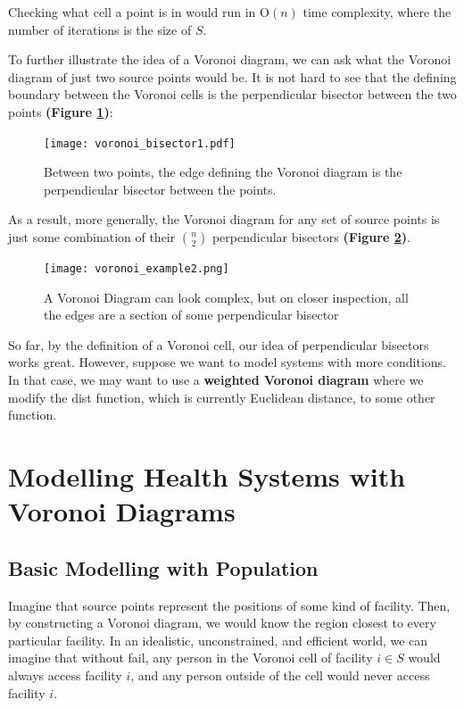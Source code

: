 \documentclass{article}
\begin{document}
Checking what cell a point is in would run in $\mathrm{O}(n)$ time complexity, where the number of iterations is the size of $S$.

To further illustrate the idea of a Voronoi diagram, we can ask what the Voronoi diagram of just two source points would be. It is not hard to see that the defining boundary between the Voronoi cells is the perpendicular bisector between the two points \textbf{(Figure \ref{fig:voronoi-diagram-of-2})}:

\begin{figure}[h!]
\centering
\captionsetup{justification=centering,width=.9\linewidth}

\texttt{[image: voronoi\_bisector1.pdf]}
\caption{Between two points, the edge defining the Voronoi diagram is the perpendicular bisector between the points.}
\label{fig:voronoi-diagram-of-2}
\end{figure}

As a result, more generally, the Voronoi diagram for any set of source points is just some combination of their $n \choose 2$  perpendicular bisectors \textbf{(Figure \ref{fig:voronoi-diagram-example})}.

\begin{figure}[H]
\centering
\captionsetup{justification=centering,width=0.8\linewidth}
\texttt{[image: voronoi\_example2.png]}
\caption{A Voronoi Diagram can look complex, but on closer inspection, all the edges are a section of some perpendicular bisector}
\label{fig:voronoi-diagram-example}
\end{figure}

So far, by the definition of a Voronoi cell, our idea of perpendicular bisectors works great. However, suppose we want to model systems with more conditions. In that case, we may want to use a \textbf{weighted Voronoi diagram} where we modify the dist function, which is currently Euclidean distance, to some other function. 
\vspace{15pt}



\section{Modelling Health Systems with Voronoi Diagrams}
\subsection{Basic Modelling with Population}

Imagine that source points represent the positions of some kind of facility. Then, by constructing a Voronoi diagram, we would know the region closest to every particular facility. In an idealistic, unconstrained, and efficient world, we can imagine that without fail, any person in the Voronoi cell of facility $i \in S$ would always access facility $i$, and any person outside of the cell would never access facility $i$.
\end{document}
